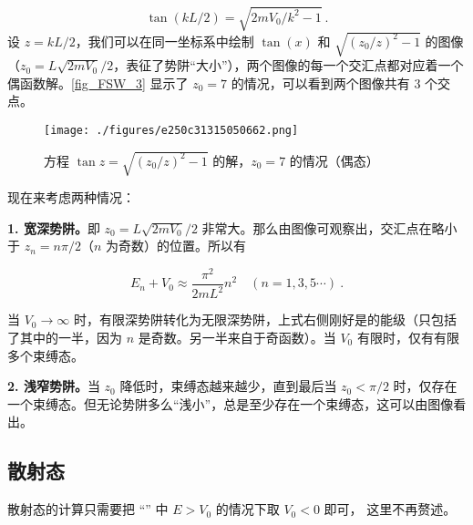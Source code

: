 \begin{equation}
\tan(k L/2)=\sqrt{2mV_0/k^2-1}~.
\end{equation}
设 $z=k L/2$，我们可以在同一坐标系中绘制 $\tan(x)$ 和 $\sqrt{(z_0/z)^2-1}$ 的图像（$z_0=L\sqrt{2mV_0}/2$，表征了势阱“大小”），两个图像的每一个交汇点都对应着一个偶函数解。\autoref{fig_FSW_3} 显示了 $z_0=7$ 的情况，可以看到两个图像共有 $3$ 个交点。

\begin{figure}[ht]
\centering
\texttt{[image: ./figures/e250c31315050662.png]}
\caption{方程 $\tan z=\sqrt{(z_0/z)^2-1}$ 的解，$z_0=7$ 的情况（偶态）} \label{fig_FSW_3}
\end{figure}

现在来考虑两种情况：

\textbf{1. 宽深势阱。}即 $z_0=L\sqrt{2mV_0}/2$ 非常大。那么由图像可观察出，交汇点在略小于 $z_n=n\pi/2$（$n$ 为奇数）的位置。所以有

\begin{equation}
E_n+V_0\approx \frac{\pi^2}{2mL^2}n^2\quad (n=1,3,5\cdots)~.
\end{equation}

当 $V_0\rightarrow \infty$ 时，有限深势阱转化为无限深势阱，上式右侧刚好是的能级（只包括了其中的一半，因为 $n$ 是奇数。另一半来自于奇函数）。当 $V_0$ 有限时，仅有有限多个束缚态。

\textbf{2. 浅窄势阱。}当 $z_0$ 降低时，束缚态越来越少，直到最后当 $z_0<\pi/2$ 时，仅存在一个束缚态。但无论势阱多么“浅小”，总是至少存在一个束缚态，这可以由图像看出。

\subsection{散射态}

散射态的计算只需要把 “” 中 $E > V_0$ 的情况下取 $V_0 < 0$ 即可， 这里不再赘述。
